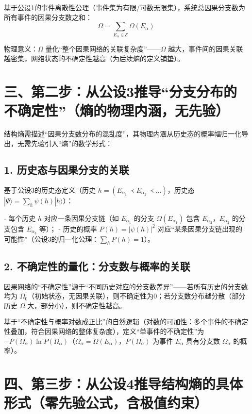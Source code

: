 \documentclass{article}
\begin{document}
基于公设1的事件离散性公理（事件集为有限/可数无限集），系统总因果分支数为所有事件的因果分支数之和：
\[
\Omega = \sum_{E_\alpha \in \mathcal{E}} \Omega(E_\alpha)
\]

物理意义：\( \Omega \) 量化“整个因果网络的关联复杂度”——\( \Omega \) 越大，事件间的因果关联越密集，网络状态的不确定性越高（为后续熵的定义铺垫）。

\section*{三、第二步：从公设3推导“分支分布的不确定性”（熵的物理内涵，无先验）}

结构熵需描述“因果分支数分布的混乱度”，其物理内涵从历史态的概率幅归一化导出，无需先验引入“熵”的数学形式：

\subsection*{1. 历史态与因果分支的关联}

基于公设3的历史态定义（历史 \( h = (E_{\alpha_1} \prec E_{\alpha_2} \prec \dots) \)，历史态 \( |\Psi\rangle = \sum_h \psi(h)|h\rangle \)）：

- 每个历史 \( h \) 对应一条因果分支链（如 \( E_{\alpha_1} \) 的分支 \( \Omega(E_{\alpha_1}) \) 包含 \( E_{\alpha_2} \)，\( E_{\alpha_2} \) 的分支包含 \( E_{\alpha_3} \) 等）；
- 历史的概率 \( P(h) = |\psi(h)|^2 \) 对应“某条因果分支链出现的可能性”（公设3的归一化公理：\( \sum_h P(h) = 1 \)）。

\subsection*{2. 不确定性的量化：分支数与概率的关联}

因果网络的“不确定性”源于“不同历史对应的分支数差异”——若所有历史的分支数均为 \( \Omega_0 \)（初始状态，无因果关联），则不确定性为0；若分支数分布越分散（部分历史 \( \Omega \) 大，部分小），则不确定性越高。

基于“不确定性与概率对数成正比”的自然逻辑（对数的可加性：多个事件的不确定性叠加，符合因果网络的整体复杂度），定义“单事件的不确定性”为 \( -P(\Omega_\alpha) \ln P(\Omega_\alpha) \)（\( \Omega_\alpha = \Omega(E_\alpha) \)，\( P(\Omega_\alpha) \) 为事件 \( E_\alpha \) 具有分支数 \( \Omega_\alpha \) 的概率）。

\section*{四、第三步：从公设4推导结构熵的具体形式（零先验公式，含极值约束）}
\end{document}
